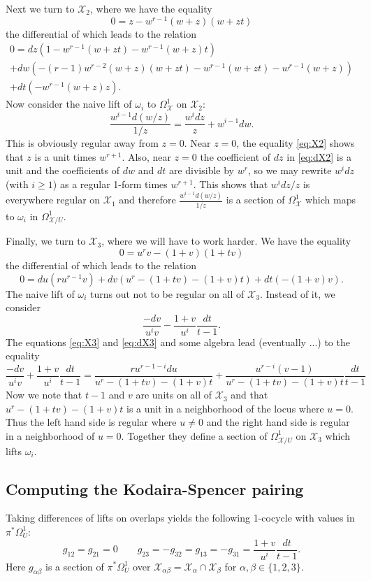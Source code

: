\documentclass[reqno]{amsart}
\theoremstyle{definition}
\theoremstyle{remark}
\def\XX{\mathcal{X}}
\begin{document}
Next we turn to $\XX_2$, where we have the equality 
\begin{equation}\label{eq:X2}
0=z-w^{r-1}(w+z)(w+zt)
\end{equation}
the differential of which leads to the relation
\begin{multline}\label{eq:dX2}
0=dz\left(1-w^{r-1}(w+zt)-w^{r-1}(w+z)t\right)\\
+dw\left(-(r-1)w^{r-2}(w+z)(w+zt)-w^{r-1}(w+zt)-w^{r-1}(w+z)\right)\\
+dt\left(-w^{r-1}(w+z)z\right).
\end{multline}
Now consider the naive lift of $\omega_i$ to $\Omega^1_{\XX}$ on
$\XX_2$:
$$\frac{w^{i-1}d(w/z)}{1/z}=\frac{w^idz}{z}+w^{i-1}dw.$$
This is obviously regular away from $z=0$. Near $z=0$, the equality
\eqref{eq:X2} shows that $z$ is a unit times $w^{r+1}$. Also, near
$z=0$ the coefficient of $dz$ in \eqref{eq:dX2} is a unit and the
coefficients of $dw$ and $dt$ are divisible by $w^{r}$, so we may
rewrite $w^idz$ (with $i\ge1$) as a regular 1-form times $w^{r+1}$.
This shows that $w^idz/z$ is everywhere regular on $\XX_1$ and
therefore $\frac{w^{i-1}d(w/z)}{1/z}$ is a section of $\Omega^1_{\XX}$
which maps to $\omega_i$ in $\Omega^1_{\XX/U}$.

Finally, we turn to $\XX_3$, where we will have to work harder.  We
have the equality
\begin{equation}\label{eq:X3}
0=u^rv-(1+v)(1+tv)
\end{equation}
the differential of which leads to the relation
\begin{equation}\label{eq:dX3}
0=du\left(ru^{r-1}v\right)
+dv\left(u^r-(1+tv)-(1+v)t\right)
+dt\left(-(1+v)v\right).
\end{equation}
The naive lift of $\omega_i$ turns out not to be regular on all of
$\XX_3$.  Instead of it, we consider
$$\frac{-dv}{u^iv}-\frac{1+v}{u^i}\frac{dt}{t-1}.$$
The equations \eqref{eq:X3} and \eqref{eq:dX3} and some algebra lead
(eventually ...) to the equality
$$\frac{-dv}{u^iv}+\frac{1+v}{u^i}\frac{dt}{t-1}=
\frac{ru^{r-1-i}du}{u^r-(1+tv)-(1+v)t}+\frac{u^{r-i}(v-1)}{u^r-(1+tv)-(1+v)t}\frac{dt}{t-1}$$
Now we note that $t-1$ and $v$ are units on all of $\XX_3$ and that 
$u^r-(1+tv)-(1+v)t$ is a unit in a neighborhood of the locus where
$u=0$.  Thus the left hand side is regular where $u\neq0$ and the
right hand side is regular in a neighborhood of $u=0$.  Together they
define a section of $\Omega^1_{\XX/U}$ on $\XX_3$ which lifts
$\omega_i$.

\subsection{Computing the Kodaira-Spencer pairing}
Taking differences of lifts on overlaps yields the following 1-cocycle
with values in $\pi^*\Omega^1_U$:
$$g_{12}=g_{21}=0\qquad g_{23}=-g_{32}=g_{13}=-g_{31}=
\frac{1+v}{u^i}\frac{dt}{t-1}.$$
Here $g_{\alpha\beta}$ is a section of $\pi^*\Omega^1_U$ over
$\XX_{\alpha\beta}=\XX_{\alpha}\cap\XX_{\beta}$ for
$\alpha,\beta\in\{1,2,3\}$.
\end{document}
